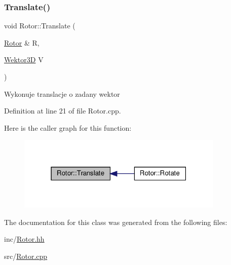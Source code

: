 \subsubsection{\texorpdfstring{Translate()}{Translate()}}
{\footnotesize\ttfamily void Rotor\+::\+Translate (\begin{DoxyParamCaption}\item[{\hyperlink{class_rotor}{Rotor} \&}]{R,  }\item[{\hyperlink{_wektor3_d_8hh_ac353a272b38b4ad342f7181ad7bdb91a}{Wektor3D}}]{V }\end{DoxyParamCaption})}

Wykonuje translacje o zadany wektor 

Definition at line 21 of file Rotor.\+cpp.

Here is the caller graph for this function\+:
\nopagebreak
\begin{figure}[H]
\begin{center}
\leavevmode
\includegraphics[width=279pt]{class_rotor_a1f00a40e0e40e8f8cf7cb15160c88cc2_icgraph}
\end{center}
\end{figure}


The documentation for this class was generated from the following files\+:\begin{DoxyCompactItemize}
\item 
inc/\hyperlink{_rotor_8hh}{Rotor.\+hh}\item 
src/\hyperlink{_rotor_8cpp}{Rotor.\+cpp}\end{DoxyCompactItemize}
